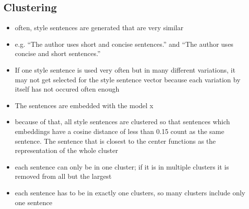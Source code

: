 \subsection{Clustering}

\begin{itemize}
  \item often, style sentences are generated that are very similar
  \item e.g. \enquote{The author uses short and concise sentences.} and \enquote{The author uses concise and short sentences.}
  \item If one style sentence is used very often but in many different variations, it may not get selected for the style sentence vector because each variation by itself has not occured often enough
  \item The sentences are embedded with the model x %
  \item because of that, all style sentences are clustered so that sentences which embeddings have a cosine distance of less than 0.15 count as the same sentence. The sentence that is closest to the center functions as the representation of the whole cluster
  \item each sentence can only be in one cluster; if it is in multiple clusters it is removed from all but the largest
  \item each sentence has to be in exactly one clusters, so many clusters include only one sentence
\end{itemize}